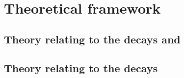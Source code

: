 \chapter{Theoretical framework}
\label{ch:theory}






\section[Introduction for the decays \btokpipimumu and \btophikmumu]{Theory relating to the
  decays \tmath{\btokpipimumu} and \tmath{\btophikmumu}}


\section[Introduction for the decay \btodsphi]{Theory relating to the
  decays \tmath{\btodsphi}}

